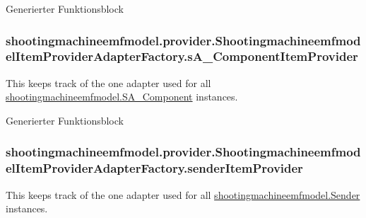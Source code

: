 Generierter Funktionsblock \hypertarget{classshootingmachineemfmodel_1_1provider_1_1_shootingmachineemfmodel_item_provider_adapter_factory_a6bf964da7d902c1bcf16405b588c0ae4}{
\subsubsection[{s\-A\-\_\-\-Component\-Item\-Provider}]{ shootingmachineemfmodel.\-provider.\-Shootingmachineemfmodel\-Item\-Provider\-Adapter\-Factory.\-s\-A\-\_\-\-Component\-Item\-Provider\hspace{0.3cm}{\ttfamily [protected]}}}\label{classshootingmachineemfmodel_1_1provider_1_1_shootingmachineemfmodel_item_provider_adapter_factory_a6bf964da7d902c1bcf16405b588c0ae4}
This keeps track of the one adapter used for all \hyperlink{interfaceshootingmachineemfmodel_1_1_s_a___component}{shootingmachineemfmodel.\-S\-A\-\_\-\-Component} instances.

Generierter Funktionsblock \hypertarget{classshootingmachineemfmodel_1_1provider_1_1_shootingmachineemfmodel_item_provider_adapter_factory_ac21bc8607365abc11611a860fa96fd0d}{
\subsubsection[{sender\-Item\-Provider}]{ shootingmachineemfmodel.\-provider.\-Shootingmachineemfmodel\-Item\-Provider\-Adapter\-Factory.\-sender\-Item\-Provider\hspace{0.3cm}{\ttfamily [protected]}}}\label{classshootingmachineemfmodel_1_1provider_1_1_shootingmachineemfmodel_item_provider_adapter_factory_ac21bc8607365abc11611a860fa96fd0d}
This keeps track of the one adapter used for all \hyperlink{interfaceshootingmachineemfmodel_1_1_sender}{shootingmachineemfmodel.\-Sender} instances.

